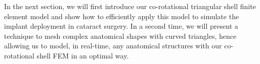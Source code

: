 In the next section, we will first introduce our co-rotational triangular shell finite element model and show how to efficiently apply this model to simulate the implant deployment in cataract surgery. In a second time, we will present a technique to mesh complex anatomical shapes with curved triangles, hence allowing us to model, in real-time, any anatomical structures with our co-rotational shell FEM in an optimal way. 



